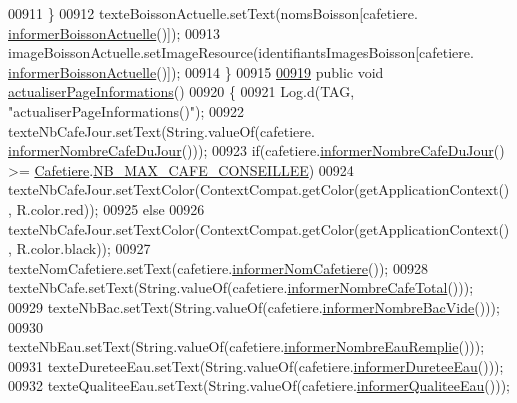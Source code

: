 \begin{DoxyCode}
{00911         \}
00912         texteBoissonActuelle.setText(nomsBoisson[cafetiere.
      \hyperlink{classcom_1_1example_1_1ekawa_1_1_cafetiere_aa7022512d5a36d2b911722ae6400379f}{informerBoissonActuelle}()]);
00913         imageBoissonActuelle.setImageResource(identifiantsImagesBoisson[cafetiere.
      \hyperlink{classcom_1_1example_1_1ekawa_1_1_cafetiere_aa7022512d5a36d2b911722ae6400379f}{informerBoissonActuelle}()]);
00914     \}
00915 
\hyperlink{classcom_1_1example_1_1ekawa_1_1_ihm_a2422719a8e893b23e95f80b5899adb76}{00919}     \textcolor{keyword}{public} \textcolor{keywordtype}{void} \hyperlink{classcom_1_1example_1_1ekawa_1_1_ihm_a2422719a8e893b23e95f80b5899adb76}{actualiserPageInformations}()
00920     \{
00921         Log.d(TAG, \textcolor{stringliteral}{"actualiserPageInformations()"});
00922         texteNbCafeJour.setText(String.valueOf(cafetiere.
      \hyperlink{classcom_1_1example_1_1ekawa_1_1_cafetiere_ac93a294ca5d2dcd4cc9c54bf5c41c3e4}{informerNombreCafeDuJour}()));
00923         \textcolor{keywordflow}{if}(cafetiere.\hyperlink{classcom_1_1example_1_1ekawa_1_1_cafetiere_ac93a294ca5d2dcd4cc9c54bf5c41c3e4}{informerNombreCafeDuJour}() >= 
      \hyperlink{classcom_1_1example_1_1ekawa_1_1_cafetiere}{Cafetiere}.\hyperlink{classcom_1_1example_1_1ekawa_1_1_cafetiere_a9e0cce07580820dfbc85696f1fb82aef}{NB\_MAX\_CAFE\_CONSEILLEE})
00924             texteNbCafeJour.setTextColor(ContextCompat.getColor(getApplicationContext(), R.color.red));
00925         \textcolor{keywordflow}{else}
00926             texteNbCafeJour.setTextColor(ContextCompat.getColor(getApplicationContext(), R.color.black));
00927         texteNomCafetiere.setText(cafetiere.\hyperlink{classcom_1_1example_1_1ekawa_1_1_cafetiere_aa267545b22527a434e812f8c001d1e8a}{informerNomCafetiere}());
00928         texteNbCafe.setText(String.valueOf(cafetiere.\hyperlink{classcom_1_1example_1_1ekawa_1_1_cafetiere_a01de1ada0bfd9d75e9c873ca1bdb62df}{informerNombreCafeTotal}()));
00929         texteNbBac.setText(String.valueOf(cafetiere.\hyperlink{classcom_1_1example_1_1ekawa_1_1_cafetiere_a6c708e64b24c32926eb787c3e7b8645a}{informerNombreBacVide}()));
00930         texteNbEau.setText(String.valueOf(cafetiere.\hyperlink{classcom_1_1example_1_1ekawa_1_1_cafetiere_a456c870bf52bcd639abdc299e50ddd73}{informerNombreEauRemplie}()));
00931         texteDureteeEau.setText(String.valueOf(cafetiere.\hyperlink{classcom_1_1example_1_1ekawa_1_1_cafetiere_a078b7b5343bfbc06dec35dbd8fb292be}{informerDureteeEau}()));
00932         texteQualiteeEau.setText(String.valueOf(cafetiere.\hyperlink{classcom_1_1example_1_1ekawa_1_1_cafetiere_a1c04bcbd87ed47f8abf08e36e0629e13}{informerQualiteeEau}()));
}
\end{DoxyCode}
